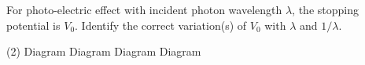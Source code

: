 
    \item For photo-electric effect with incident photon wavelength \( \lambda \), the stopping potential is \( V_0 \). Identify the correct variation(s) of \( V_0 \) with \( \lambda \) and \( 1/\lambda \).
        \begin{tasks}(2)
            \task Diagram
            \task Diagram
            \task Diagram
            \task Diagram
        \end{tasks}
